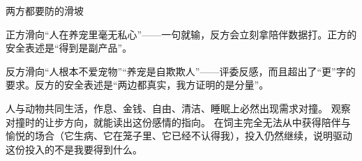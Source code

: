 \documentclass[prep,both]{debate}
\begin{document}
\begin{fields}
\begin{bullets}
\end{bullets}
\begin{sidecard}{两方都要防的滑坡}\end{sidecard}
\begin{bullets}
\item 正方滑向“人在养宠里毫无私心”——一句就输，反方会立刻拿陪伴数据打。正方的安全表述是“得到是副产品”。
\item 反方滑向“人根本不爱宠物”“养宠是自欺欺人”——评委反感，而且超出了“更”字的要求。反方的安全表述是“两边都真实，我方证明的是分量”。
\end{bullets}
\end{fields}
\begin{fields}
\begin{mechanism}[机制 （三步）]
\step 人与动物共同生活，作息、金钱、自由、清洁、睡眠上必然出现需求对撞。
\step 观察对撞时的让步方向，就能读出这份感情的指向。
\step 在饲主完全无法从中获得陪伴与愉悦的场合（它生病、它在笼子里、它已经不认得我），投入仍然继续，说明驱动这份投入的不是我要得到什么。


\end{mechanism}
\end{fields}
\end{document}
